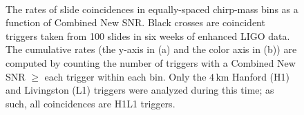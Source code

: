 \begin{figure}[p]
\begin{center}
 \\
\end{center}
\caption{The rates of slide coincidences in equally-spaced chirp-mass bins as a function of Combined New SNR. Black crosses are coincident triggers taken from 100 slides in six weeks of enhanced \ac{LIGO} data. The cumulative rates (the y-axis in (a) and the color axis in (b)) are computed by counting the number of triggers with a Combined New SNR $\geq$ each trigger within each bin. Only the $4\,\mathrm{km}$ Hanford (H1) and Livingston (L1) triggers were analyzed during this time; as such, all coincidences are H1L1 triggers.}
\label{fig:newsnr_v_mchirp}
\end{figure}

